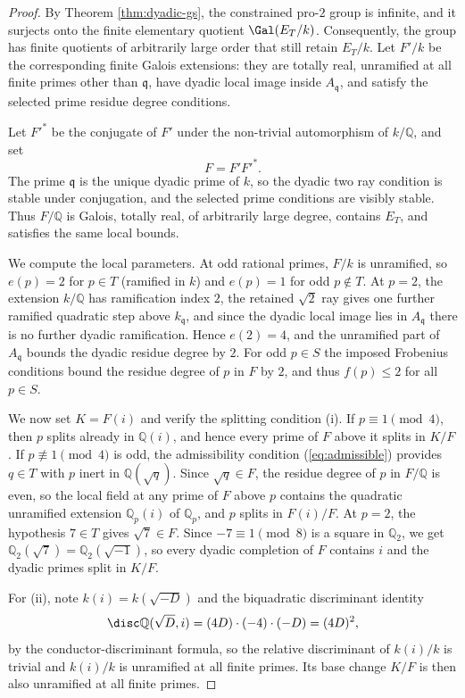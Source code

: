 \begin{proof}
By Theorem \ref{thm:dyadic-gs}, the constrained pro-$2$ group is infinite, and it surjects onto the finite elementary quotient $\Gal(E_T/k)$.  Consequently, the group has finite quotients of arbitrarily large order that still retain $E_T/k$.  Let $F'/k$ be the corresponding finite Galois extensions: they are totally real, unramified at all finite primes other than $\mathfrak{q}$, have dyadic local image inside $A_{\mathfrak{q}}$, and satisfy the selected prime residue degree conditions.

Let $F'^*$ be the conjugate of $F'$ under the non-trivial automorphism of $k/\mathbb{Q}$, and set
\[
   F=F'F'^*.
\]
The prime $\mathfrak{q}$ is the unique dyadic prime of $k$, so the dyadic two ray condition is stable under conjugation, and the selected prime conditions are visibly stable.  Thus $F/\mathbb{Q}$ is Galois, totally real, of arbitrarily large degree, contains $E_T$, and satisfies the same local bounds.

We compute the local parameters.  At odd rational primes, $F/k$ is unramified, so $e(p)=2$ for $p\in T$ (ramified in $k$) and $e(p)=1$ for odd $p\notin T$.  At $p=2$, the extension $k/\mathbb{Q}$ has ramification index $2$, the retained $\sqrt2$ ray gives one further ramified quadratic step above $k_{\mathfrak{q}}$, and since the dyadic local image lies in $A_{\mathfrak{q}}$ there is no further dyadic ramification.  Hence $e(2)=4$, and the unramified part of $A_{\mathfrak{q}}$ bounds the dyadic residue degree by $2$.  For odd $p\in S$ the imposed Frobenius conditions bound the residue degree of $p$ in $F$ by $2$, and thus $f(p)\leq2$ for all $p\in S$.

We now set $K=F(i)$ and verify the splitting condition (i).  If $p\equiv1\pmod4$, then $p$ splits already in $\mathbb{Q}(i)$, and hence every prime of $F$ above it splits in $K/F$.  If $p\not\equiv1\pmod4$ is odd, the admissibility condition (\ref{eq:admissible}) provides $q\in T$ with $p$ inert in $\mathbb{Q}(\sqrt q)$.  Since $\sqrt q\in F$, the residue degree of $p$ in $F/\mathbb{Q}$ is even, so the local field at any prime of $F$ above $p$ contains the quadratic unramified extension $\mathbb{Q}_p(i)$ of $\mathbb{Q}_p$, and $p$ splits in $F(i)/F$.  At $p=2$, the hypothesis $7\in T$ gives $\sqrt7\in F$.  Since $-7\equiv1\pmod8$ is a square in $\mathbb{Q}_2$, we get $\mathbb{Q}_2(\sqrt7)=\mathbb{Q}_2(\sqrt{-1})$, so every dyadic completion of $F$ contains $i$ and the dyadic primes split in $K/F$.

For (ii), note $k(i)=k(\sqrt{-D})$ and the biquadratic discriminant identity
\[
   \disc\mathbb{Q}(\sqrt D,i)=(4D)\cdot(-4)\cdot(-D)=(4D)^2,
\]
by the conductor-discriminant formula, so the relative discriminant of $k(i)/k$ is trivial and $k(i)/k$ is unramified at all finite primes.  Its base change $K/F$ is then also unramified at all finite primes.


\end{proof}
